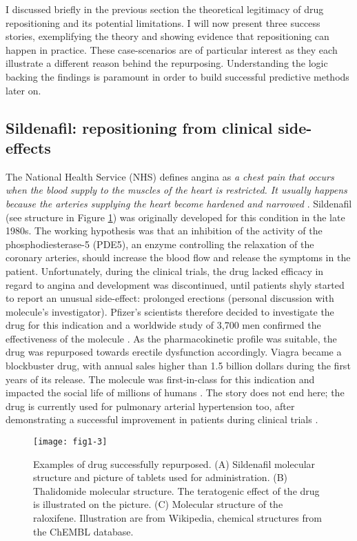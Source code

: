 I discussed briefly in the previous section the theoretical legitimacy of drug repositioning and its potential limitations. I will now present three success stories, exemplifying the theory and showing evidence that repositioning can happen in practice. These case-scenarios are of particular interest as they each illustrate a different reason behind the repurposing. Understanding the logic backing the findings is paramount in order to build successful predictive methods later on.

\subsection{Sildenafil: repositioning from clinical side-effects}

The National Health Service (NHS) defines angina as \emph{a chest pain that occurs when the blood supply to the muscles of the heart is restricted. It usually happens because the arteries supplying the heart become hardened and narrowed} \citep{anginanhs}. Sildenafil (see structure in Figure \ref{fig1-3}) was originally developed for this condition in the late 1980s. The working hypothesis was that an inhibition of the activity of the phosphodiesterase-5 (PDE5), an enzyme controlling the relaxation of the coronary arteries, should increase the blood flow and release the symptoms in the patient. Unfortunately, during the clinical trials, the drug lacked efficacy in regard to angina and development was discontinued, until patients shyly started to report an unusual side-effect: prolonged erections (personal discussion with molecule's investigator). Pfizer's scientists therefore decided to investigate the drug for this indication and a worldwide study of 3,700 men confirmed the effectiveness of the molecule \citep{nytimes}. As the pharmacokinetic profile was suitable, the drug was repurposed towards erectile dysfunction accordingly. Viagra became a blockbuster drug, with annual sales higher than 1.5 billion dollars \citep{renaud2002erectile} during the first years of its release. The molecule was first-in-class for this indication and impacted the social life of millions of humans \citep{renaud2002erectile}. The story does not end here; the drug is currently used for pulmonary arterial hypertension too, after demonstrating a successful improvement in patients during clinical trials \citep{ghofrani2006sildenafil}.

\begin{figure}[ht]
    \centering
    \texttt{[image: fig1-3]}
    \caption{Examples of drug successfully repurposed. (A) Sildenafil molecular structure and picture of tablets used for administration. (B) Thalidomide molecular structure. The teratogenic effect of the drug is illustrated on the picture. (C) Molecular structure of the raloxifene. Illustration are from Wikipedia, chemical structures from the ChEMBL database.}
    \label{fig1-3}
\end{figure}

